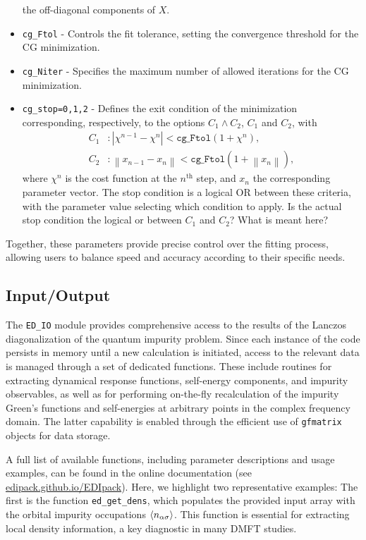 \documentclass[edipack_sp.tex]{subfiles}
\begin{document}
\begin{itemize}
the off-diagonal components of $X$.
\item \texttt{cg\_Ftol} - Controls the fit tolerance, setting the 
convergence threshold for the CG minimization.
\item \texttt{cg\_Niter} - Specifies the maximum number of allowed 
iterations for the CG minimization.
\item \texttt{cg\_stop=0,1,2} - Defines the exit condition of the 
minimization corresponding, respectively, to the options  $C_1\land C_2$, $C_1$ and $C_2$, with
\begin{align*}
C_1 & : |\chi^{n-1} - \chi^n| < \mathtt{cg\_Ftol} (1+\chi^n), \\
C_2 & : \left\|x_{n-1} - x_n\right\| < 
\mathtt{cg\_Ftol} (1+\left\|x_n\right\|),
\end{align*}
where $\chi^n$ is the cost function at the $n^\mathrm{th}$ step, and 
$x_n$ the corresponding parameter vector. The stop condition is a 
logical OR between these criteria, with the parameter value selecting 
which condition to apply. Is the actual stop condition the logical or between $C_1$ and $C_2$? What is meant here?
\end{itemize}

Together, these parameters provide precise control over the fitting 
process, allowing users to balance speed and accuracy according to 
their specific needs.



\subsection{Input/Output}\label{sSecIO}
The \texttt{ED\_IO} module provides comprehensive access to the 
results of the Lanczos diagonalization of the quantum impurity 
problem. Since each instance of the code persists in memory until a 
new calculation is initiated, access to the relevant data is managed 
through a set of dedicated functions. These include routines for 
extracting dynamical response functions, self-energy components, and 
impurity observables, as well as for performing on-the-fly 
recalculation of the impurity Green's functions and self-energies at 
arbitrary points in the complex frequency domain. The latter 
capability is enabled through the efficient use of \texttt{gfmatrix} 
objects for data storage.

A full list of available functions, including parameter descriptions 
and usage examples, can be found in the online documentation (see \href{https://edipack.github.io/EDIpack/}{edipack.github.io/EDIpack}).  
Here, we highlight two representative examples:
The first is the function \texttt{ed\_get\_dens}, which populates the 
provided input array with the orbital impurity occupations 
$\langle n_{\alpha\sigma}\rangle$. This function is essential for extracting 
local density information, a key diagnostic in many DMFT studies.
\end{document}
